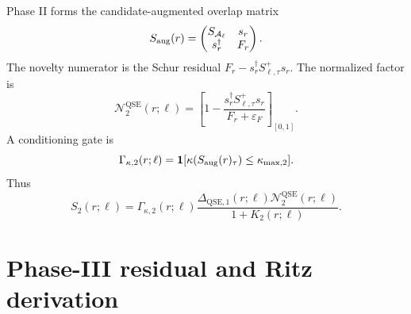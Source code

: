 \documentclass[10pt,twocolumn]{article}
\newcommand{\Acal}{\mathcal A}
\newcommand{\qse}{\mathrm{QSE}}
\newcommand{\eps}{\varepsilon}
\begin{document}
Phase II forms the candidate-augmented overlap matrix
\begin{equation}
S_{\rm aug}(r)=
\begin{pmatrix}
S_{\Acal_\ell}&s_r\\
s_r^\dagger&F_r
\end{pmatrix}.
\label{eq:Saug_qse}
\end{equation}
The novelty numerator is the Schur residual \(F_r-s_r^\dagger S_{\ell,\tau}^+s_r\). The normalized factor is
\begin{equation}
\mathcal N_2^{\qse}(r;\ell)=
\left[1-\frac{s_r^\dagger S_{\ell,\tau}^+s_r}{F_r+\eps_F}\right]_{[0,1]}.
\label{eq:N2}
\end{equation}
A conditioning gate is
\begin{equation}
\Gamma_{\kappa,2}(r;\ell)=
\mathbf 1[\kappa(S_{\rm aug}(r)_\tau)\le\kappa_{\max,2}].
\label{eq:kappa_gate}
\end{equation}
Thus
\begin{equation}
S_2(r;\ell)=
\Gamma_{\kappa,2}(r;\ell)
\frac{\Delta_{\qse,1}(r;\ell)\mathcal N_2^{\qse}(r;\ell)}{1+K_2(r;\ell)}.
\label{eq:S2}
\end{equation}

\section{Phase-III residual and Ritz derivation}
\end{document}
